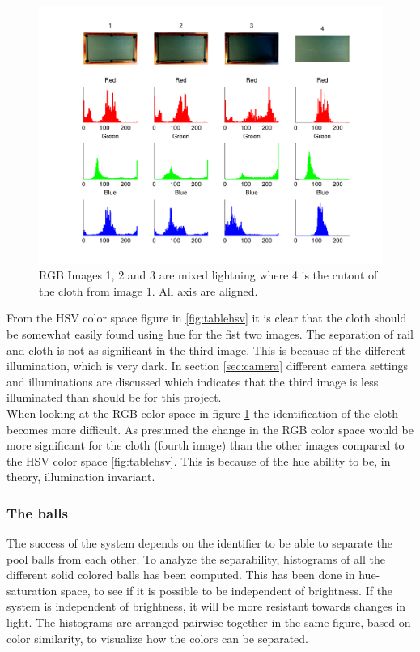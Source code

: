 \begin{figure}[H]
\begin{center}
\leavevmode
\includegraphics[width=1\textwidth]{images/rgb_hist_table}
\end{center}
\caption{RGB Images 1, 2 and 3 are mixed lightning where 4 is the cutout of the cloth from image 1. All axis are aligned.}
\label{fig:tablergb}
\end{figure}

From the HSV color space figure in \ref{fig:tablehsv} it is clear that the cloth should be somewhat easily found using hue for the fist two images. The separation of rail and cloth is not as significant in the third image. This is because of the different illumination, which is very dark. In section \ref{sec:camera} different camera settings and illuminations are discussed which indicates that the third image is less illuminated than should be for this project.\\

When looking at the RGB color space in figure \ref{fig:tablergb} the identification of the cloth becomes more difficult. As presumed the change in the RGB color space would be more significant for the cloth (fourth image) than the other images compared to the HSV color space \ref{fig:tablehsv}. This is because of the hue ability to be, in theory, illumination invariant.\\

\subsubsection{The balls}
\label{sec:analballs}
The success of the system depends on the identifier to be able to separate the pool balls from each other. To analyze the separability, histograms of all the different solid colored balls has been computed. This has been done in hue-saturation space, to see if it is possible to be independent of brightness. If the system is independent of brightness, it will be more resistant towards changes in light. The histograms are arranged pairwise together in the same figure, based on color similarity, to visualize how the colors can be separated.

